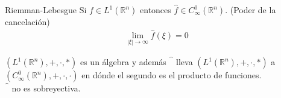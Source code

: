 \begin{lemma}{Riemman-Lebesgue}
  Si $f\in L^{1}(\mathbb{R}^{n})$ entonces $\hat{f}\in C^{0}_{\infty}(\mathbb{R}^{n})$. (Poder de la cancelación)
  \begin{align*}
    \lim_{|\xi| \to \infty}\hat{f}(\xi)=0
  \end{align*}
\end{lemma}
\begin{note}{}
  $(L^{1}(\mathbb{R}^{n}),+,\cdot,*)$ es un álgebra y además $\hat{\phantom{f}}$ lleva $(L^{1}(\mathbb{R}^{n}),+,\cdot,*)$ a $(C^{0}_{\infty}(\mathbb{R}^{n}),+,\cdot,\cdot)$ en dónde el segundo es el producto de funciones.\\
  $\hat{\phantom{f}}$ no es sobreyectiva. 
\end{note}
